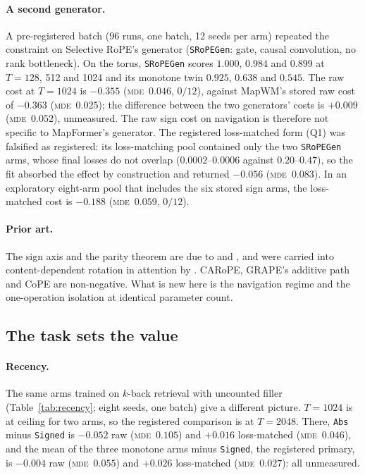 \documentclass[10pt]{article}
\newcommand{\mde}{\textsc{mde}}
\newcommand{\arm}[1]{\texttt{#1}}
\begin{document}
\paragraph{A second generator.} A pre-registered batch (96 runs, one batch, 12 seeds per arm) repeated
the constraint on Selective RoPE's generator (\arm{SRoPEGen}: gate, causal convolution, no rank
bottleneck). On the torus, \arm{SRoPEGen} scores $1.000$, $0.984$ and $0.899$ at $T=128$, 512 and
1024 and its monotone twin $0.925$, $0.638$ and $0.545$. The raw cost at $T=1024$ is $-0.355$ (\mde\
$0.046$, $0/12$), against MapWM's stored raw cost of $-0.363$ (\mde\ $0.025$); the difference between the
two generators' costs is $+0.009$ (\mde\ $0.052$), unmeasured. The raw sign cost on navigation is therefore
not specific to MapFormer's generator. The registered loss-matched form (Q1) was falsified as
registered: its loss-matching pool contained only the two \arm{SRoPEGen} arms, whose final losses do not
overlap ($0.0002$--$0.0006$ against $0.20$--$0.47$), so the fit absorbed the effect by construction and
returned $-0.056$ (\mde\ $0.083$). In an exploratory eight-arm pool that includes the six stored sign
arms, the loss-matched cost is $-0.188$ (\mde\ $0.059$, $0/12$). %

\paragraph{Prior art.} The sign axis and the parity theorem are due to \citet{sarrof2024expressive} and
\citet{grazzi2025unlocking}, and were carried into content-dependent rotation in attention by
\citet{movahedi2026srope}. CARoPE, GRAPE's additive path and CoPE are non-negative. What is new here is
the navigation regime and the one-operation isolation at identical parameter count.

\subsection{The task sets the value}
\label{sec:c3-task}

\paragraph{Recency.} The same arms trained on $k$-back retrieval with uncounted filler
(Table~\ref{tab:recency}; eight seeds, one batch) give a different picture. $T=1024$ is at ceiling for
two arms, so the registered comparison is at $T=2048$. There, \arm{Abs} minus \arm{Signed} is $-0.052$
raw (\mde\ $0.105$) and $+0.016$ loss-matched (\mde\ $0.046$), and the mean of the three monotone arms
minus \arm{Signed}, the registered primary, is $-0.004$ raw (\mde\ $0.055$) and $+0.026$ loss-matched
(\mde\ $0.027$): all unmeasured. %
\end{document}
